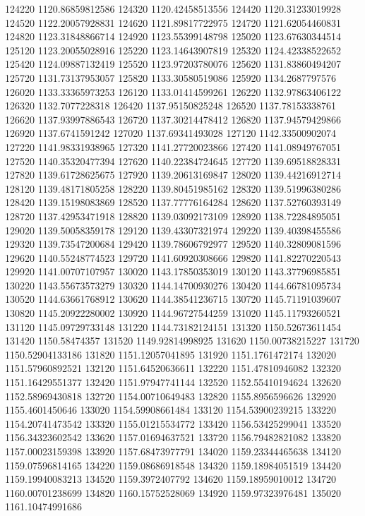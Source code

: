 {124220 1120.86859812586
124320 1120.42458513556
124420 1120.31233019928
124520 1122.20057928831
124620 1121.89817722975
124720 1121.62054460831
124820 1123.31848866714
124920 1123.55399148798
125020 1123.67630344514
125120 1123.20055028916
125220 1123.14643907819
125320 1124.42338522652
125420 1124.09887132419
125520 1123.97203780076
125620 1131.83860494207
125720 1131.73137953057
125820 1133.30580519086
125920 1134.2687797576
126020 1133.33365973253
126120 1133.01414599261
126220 1132.97863406122
126320 1132.7077228318
126420 1137.95150825248
126520 1137.78153338761
126620 1137.93997886543
126720 1137.30214478412
126820 1137.94579429866
126920 1137.6741591242
127020 1137.69341493028
127120 1142.33500902074
127220 1141.98331938965
127320 1141.27720023866
127420 1141.08949767051
127520 1140.35320477394
127620 1140.22384724645
127720 1139.69518828331
127820 1139.61728625675
127920 1139.20613169847
128020 1139.44216912714
128120 1139.48171805258
128220 1139.80451985162
128320 1139.51996380286
128420 1139.15198083869
128520 1137.77776164284
128620 1137.52760393149
128720 1137.42953471918
128820 1139.03092173109
128920 1138.72284895051
129020 1139.50058359178
129120 1139.43307321974
129220 1139.40398455586
129320 1139.73547200684
129420 1139.78606792977
129520 1140.32809081596
129620 1140.55248774523
129720 1141.60920308666
129820 1141.82270220543
129920 1141.00707107957
130020 1143.17850353019
130120 1143.37796985851
130220 1143.55673573279
130320 1144.14700930276
130420 1144.66781095734
130520 1144.63661768912
130620 1144.38541236715
130720 1145.71191039607
130820 1145.20922280002
130920 1144.96727544259
131020 1145.11793260521
131120 1145.09729733148
131220 1144.73182124151
131320 1150.52673611454
131420 1150.58474357
131520 1149.92814998925
131620 1150.00738215227
131720 1150.52904133186
131820 1151.12057041895
131920 1151.1761472174
132020 1151.57960892521
132120 1151.64520636611
132220 1151.47810946082
132320 1151.16429551377
132420 1151.97947741144
132520 1152.55410194624
132620 1152.58969430818
132720 1154.00710649483
132820 1155.8956596626
132920 1155.4601450646
133020 1154.59908661484
133120 1154.53900239215
133220 1154.20741473542
133320 1155.01215534772
133420 1156.53425299041
133520 1156.34323602542
133620 1157.01694637521
133720 1156.79482821082
133820 1157.00023159398
133920 1157.68473977791
134020 1159.23344465638
134120 1159.07596814165
134220 1159.08686918548
134320 1159.18984051519
134420 1159.19940083213
134520 1159.3972407792
134620 1159.18959010012
134720 1160.00701238699
134820 1160.15752528069
134920 1159.97323976481
135020 1161.10474991686
}
